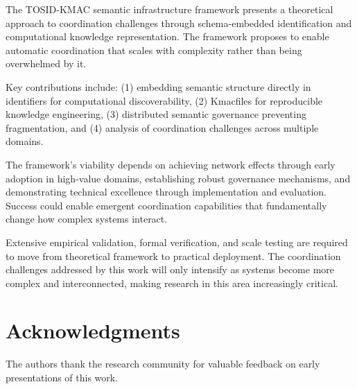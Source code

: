 \documentclass[conference]{IEEEtran}
\begin{document}
The TOSID-KMAC semantic infrastructure framework presents a theoretical approach to coordination challenges through schema-embedded identification and computational knowledge representation. The framework proposes to enable automatic coordination that scales with complexity rather than being overwhelmed by it.

Key contributions include: (1) embedding semantic structure directly in identifiers for computational discoverability, (2) Kmacfiles for reproducible knowledge engineering, (3) distributed semantic governance preventing fragmentation, and (4) analysis of coordination challenges across multiple domains.

The framework's viability depends on achieving network effects through early adoption in high-value domains, establishing robust governance mechanisms, and demonstrating technical excellence through implementation and evaluation. Success could enable emergent coordination capabilities that fundamentally change how complex systems interact.

Extensive empirical validation, formal verification, and scale testing are required to move from theoretical framework to practical deployment. The coordination challenges addressed by this work will only intensify as systems become more complex and interconnected, making research in this area increasingly critical.

\section*{Acknowledgments}

The authors thank the research community for valuable feedback on early presentations of this work.
\end{document}
